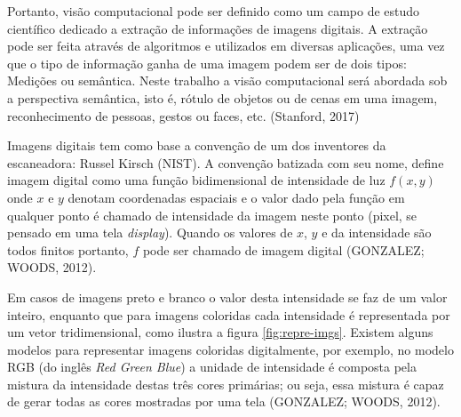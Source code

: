 \documentclass[12pt]{report}
\begin{document}
Portanto, visão computacional pode ser definido como um campo de estudo científico dedicado a extração de informações de imagens digitais. A extração pode ser feita através de algoritmos e utilizados em diversas aplicações, uma vez que o tipo de informação ganha de uma imagem podem ser de dois tipos: Medições ou semântica. Neste trabalho a visão computacional será abordada sob a perspectiva semântica, isto é, rótulo de objetos ou de cenas em uma imagem, reconhecimento de pessoas, gestos ou faces, etc. (Stanford, 2017)

Imagens digitais tem como base a convenção de um dos inventores da escaneadora: Russel Kirsch (NIST). A convenção batizada com seu nome, define imagem digital como uma função bidimensional de intensidade de luz $f(x, y)$ onde $x$ e $y$ denotam coordenadas espaciais e o valor dado pela função em qualquer ponto é chamado de intensidade da imagem neste ponto (pixel, se pensado em uma tela \textit{display}). Quando os valores de $x$, $y$ e da intensidade são todos finitos portanto, $f$ pode ser chamado de imagem digital (GONZALEZ; WOODS, 2012). 

Em casos de imagens preto e branco o valor desta intensidade se faz de um valor inteiro, enquanto que para imagens coloridas cada intensidade é representada por um vetor tridimensional, como ilustra a figura \ref{fig:repre-imgs}. Existem alguns modelos para representar imagens coloridas digitalmente, por exemplo, no modelo RGB (do inglês \textit{Red Green Blue}) a unidade de intensidade é composta pela mistura da intensidade destas três cores primárias; ou seja, essa mistura é capaz de gerar todas as cores mostradas por uma tela (GONZALEZ; WOODS, 2012). 

\end{document}
